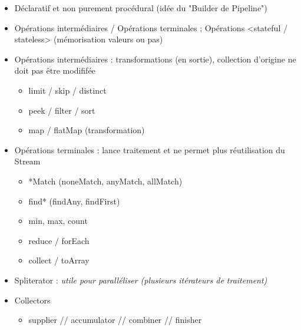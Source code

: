 \documentclass[11pt,twoside,a4paper]{article}
\begin{document}
\begin{landscape}
\begin{multicols}{2}
\begin{itemize}
		\begin{itemize}
			\item[] D{\'e}claratif et non purement proc{\'e}dural (id{\'e}e du "Builder de Pipeline")
			\item[] Op{\'e}rations interm{\'e}diaires / Op{\'e}rations terminales ; Op{\'e}rations <stateful / stateless> (m{\'e}morisation valeurs ou pas)
			\item[] Op{\'e}rations interm{\'e}diaires : transformations (en sortie), collection d'origine ne doit pas {\^e}tre modifif{\'e}e
			\begin{itemize}
				\item[] limit / skip / distinct
				\item[] peek / filter / sort
				\item[] map / flatMap (transformation)
			\end{itemize}
			\item[] Op{\'e}rations terminales : lance traitement et ne permet plus r{\'e}utilisation du Stream
			\begin{itemize}
				\item[] *Match (noneMatch, anyMatch, allMatch)
				\item[] find* (findAny, findFirst)
				\item[] min, max, count
				\item[] reduce / forEach
				\item[] collect / toArray
			\end{itemize}
			\item[] Spliterator : \emph{utile pour parall{\'e}liser (plusieurs it{\'e}rateurs de traitement)}
			\item[] Collectors
			\begin{itemize}
				\item[] supplier // accumulator // combiner // finisher
			\end{itemize}
		\end{itemize}
	\end{itemize}
	
	\vfill
	
	\columnbreak
	

\end{multicols}
\end{landscape}
\end{document}
